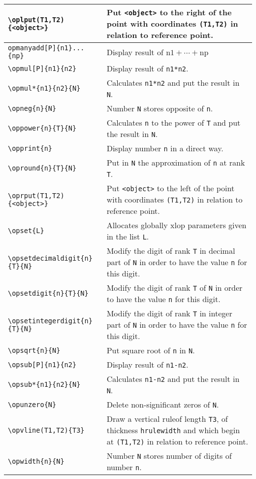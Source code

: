 \documentclass[12pt]{report}
\newcommand\package[1]{\textsf{#1}}
\begin{document}
\begin{longtable}{|l|p{6.3cm}|}
  \verb+\oplput(T1,T2){<object>}+ &
  Put \verb+<object>+ to the right of the point with coordinates
  \verb+(T1,T2)+ in relation to reference point. \\\hline
  \verb+opmanyadd[P]{n1}...{np}+ &
  Display result of $\mathrm{n1}+\cdots+\mathrm{np}$ \\\hline
  \verb+\opmul[P]{n1}{n2}+ &
  Display result of \verb+n1*n2+. \\\hline
  \verb+\opmul*{n1}{n2}{N}+ &
  Calculates \verb+n1*n2+ and put the result in \verb+N+. \\\hline
  \verb+\opneg{n}{N}+ &
  Number \verb+N+ stores opposite of \verb+n+. \\\hline
  \verb+\oppower{n}{T}{N}+ &
  Calculates \verb+n+ to the power of \verb+T+ and put the result in
  \verb+N+. \\\hline
  \verb+\opprint{n}+ &
  Display number \verb+n+ in a direct way. \\\hline
  \verb+\opround{n}{T}{N}+ &
  Put in \verb+N+ the approximation of \verb+n+ at rank \verb+T+.
  \\\hline
  \verb+\oprput(T1,T2){<object>}+ &
  Put \verb+<object>+ to the left of the point with coordinates
  \verb+(T1,T2)+ in relation to reference point. \\\hline
  \verb+\opset{L}+ &
  Allocates globally \package{xlop} parameters given in the list
  \verb+L+. \\\hline
  \verb+\opsetdecimaldigit{n}{T}{N}+ &
  Modify the digit of rank \verb+T+ in decimal part of \verb+N+ in
  order to have the value \verb+n+ for this digit. \\\hline
  \verb+\opsetdigit{n}{T}{N}+ &
  Modify the digit of rank \verb+T+ of \verb+N+ in
  order to have the value \verb+n+ for this digit. \\\hline
  \verb+\opsetintegerdigit{n}{T}{N}+ &
  Modify the digit of rank \verb+T+ in integer part of \verb+N+ in
  order to have the value \verb+n+ for this digit. \\\hline
  \verb+\opsqrt{n}{N}+ & Put square root of \verb+n+ in
  \verb+N+. \\\hline
  \verb+\opsub[P]{n1}{n2}+ &
  Display result of \verb+n1-n2+. \\\hline
  \verb+\opsub*{n1}{n2}{N}+ &
  Calculates \verb+n1-n2+ and put the result in \verb+N+. \\\hline
  \verb+\opunzero{N}+ &
  Delete non-significant zeros of \verb+N+. \\\hline
  \verb+\opvline(T1,T2){T3}+ &
  Draw a vertical ruleof length \verb+T3+, of thickness
  \verb+hrulewidth+ and which begin at \verb+(T1,T2)+ in relation to
  reference point. \\\hline
  \verb+\opwidth{n}{N}+ &
  Number \verb+N+ stores number of digits of number \verb+n+. \\\hline
\end{longtable}
\end{document}
